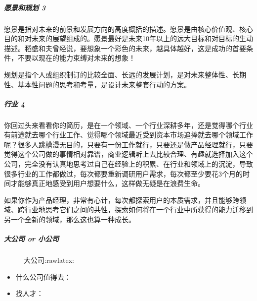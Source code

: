 \documentclass[letterpaper,10pt,english]{sphinxmanual}
\begin{document}
\subparagraph{愿景和规划 3\sphinxfootnotemark[833]}
\label{\detokenize{chapter_interview/choose:id6}}%
\begin{footnotetext}[833]\sphinxAtStartFootnote
{}
%
\end{footnotetext}\ignorespaces 
愿景是指对未来的前景和发展方向的高度概括的描述。愿景是由核心价值观、核心目的和对未来的展望组成的。愿景最好是未来10年以上的远大目标和对目标的生动描述。稻盛和夫曾经说，要想象一个彩色的未来，越具体越好，这是成功的首要条件，不要以现在的能力束缚对未来的想象！

规划是指个人或组织制订的比较全面、长远的发展计划，是对未来整体性、长期性、基本性问题的思考和考量，是设计未来整套行动的方案。


\subparagraph{行业 4\sphinxfootnotemark[834]}
\label{\detokenize{chapter_interview/choose:id7}}%
\begin{footnotetext}[834]\sphinxAtStartFootnote
{}
%
\end{footnotetext}\ignorespaces 
你回过头来看看你的简历，是在一个领域、一个行业深耕多年，还是觉得哪个行业有前途就去哪个行业工作、觉得哪个领域最近受到资本市场追捧就去哪个领域工作呢？很多人跳槽漫无目的，只要有一份工作就行，只要还是做产品经理就行，只要觉得这个公司做的事情相对靠谱，商业逻辑听上去比较合理、有趣就选择加入这个公司，完全没有认真地思考过自己在经验上的积累、在行业和领域上的沉淀，导致很多行业的工作都做过，每次都要重新调研用户需求，每次都至少要花3个月的时间才能够真正地感受到用户想要什么，这样做无疑是在浪费生命。

如果你作为产品经理，非常有心计，每次都探索用户的本质需求，并且能够跨领域、跨行业地思考它们之间的共性，探索如何将在一个行业中所获得的能力迁移到另一个全新的领域，那么这也算一种成长。


\subparagraph{大公司 or 小公司}
\label{\detokenize{chapter_interview/choose:or}}
\begin{figure}[H]
\centering
\capstart

\noindent{}
\caption{大公司:raw\sphinxhyphen{}latex:}\label{\detokenize{chapter_interview/choose:id10}}\end{figure}
\begin{itemize}
\item {} 
什么公司值得去：

\item {} 
找人才：

\end{itemize}
\end{document}
